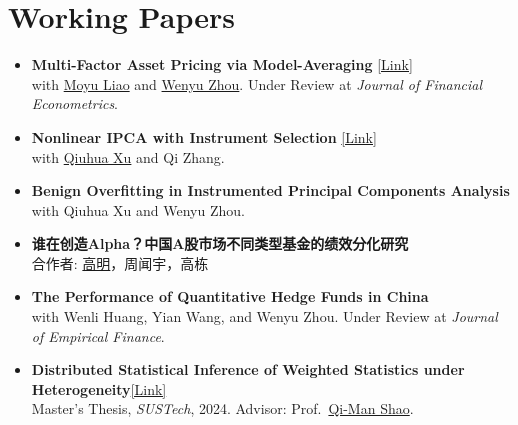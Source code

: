 \documentclass[11pt, a4paper]{article}
\begin{document}
\section{Working Papers}

\begin{itemize}
  \item \textbf{Multi-Factor Asset Pricing via Model-Averaging}
    \href{https://www.jianguoyun.com/p/DbF1rJUQ0KLMDRjXyaQGIAA}{[Link]}\\[4pt]
    with \href{https://liaomoyu.weebly.com/}{Moyu Liao} and
    \href{https://person.zju.edu.cn/wenyuzhou}{Wenyu Zhou}.
    Under Review at \textit{Journal of Financial Econometrics}.



  \item \textbf{Nonlinear IPCA with Instrument Selection}
  \href{https://www.jianguoyun.com/p/Ddb63f0QyMuCDhjdsKkGIAA}{[Link]}\\[4pt]
    with \href{https://jinrong.swufe.edu.cn/info/2039/23537.htm}{Qiuhua Xu} and Qi Zhang.




  \item \textbf{Benign Overfitting in Instrumented Principal Components Analysis}\\[4pt]
    with Qiuhua Xu and Wenyu Zhou.

  \item \textbf{谁在创造Alpha？中国A股市场不同类型基金的绩效分化研究}\\[4pt]
    合作者: \href{http://scholar.pku.edu.cn/gao}{高明}，周闻宇，高栋

  \item \textbf{The Performance of Quantitative Hedge Funds in China}\\[4pt]
    with Wenli Huang, Yian Wang, and Wenyu Zhou.
    Under Review at \textit{Journal of Empirical Finance}.

  \item \textbf{Distributed Statistical Inference of Weighted Statistics under Heterogeneity}\href{https://kc.sustech.edu.cn/handle/2SGJ60CL/778739?mode=full&submit_simple=Show+full+item+record}{[Link]}\\[4pt]
    Master's Thesis, \textit{SUSTech}, 2024.
    Advisor: Prof.\ \href{https://faculty.sustech.edu.cn/shaoqm}{Qi-Man Shao}.

 
\end{itemize}
\end{document}
